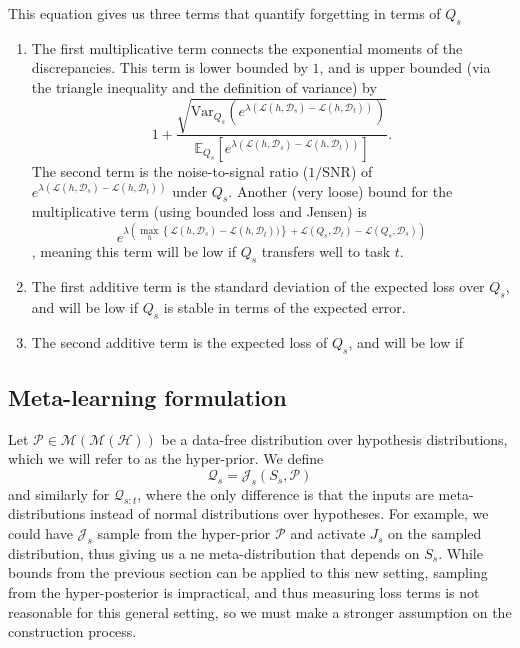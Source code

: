\documentclass[letterpaper]{article}
\theoremstyle{definition}
\begin{document}
This equation gives us three terms that quantify forgetting in terms of $Q_s$
\begin{enumerate}
	\item The first multiplicative term connects the exponential moments of the discrepancies. This term is lower bounded by $1$, and is upper bounded (via the triangle inequality and the definition of variance) by $$1+\frac{\sqrt{\mathrm{Var}_{Q_s}(e^{\lambda(\mathcal{L}(h,\mathcal{D}_s)-\mathcal{L}(h,\mathcal{D}_t))})}}{\mathbb{E}_{Q_s}\left [e^{\lambda(\mathcal{L}(h,\mathcal{D}_s)-\mathcal{L}(h,\mathcal{D}_t))}\right ]}.$$ The second term is the noise-to-signal ratio ($1/\mathrm{SNR}$) of $e^{\lambda(\mathcal{L}(h,\mathcal{D}_s)-\mathcal{L}(h,\mathcal{D}_t))}$ under $Q_s$.
	Another (very loose) bound for the multiplicative term (using bounded loss and Jensen) is $$e^{\lambda (\max_h \left \{\mathcal{L}(h,\mathcal{D}_s)-\mathcal{L}(h,\mathcal{D}_t))\right \}+\mathcal{L}(Q_s,\mathcal{D}_t)-\mathcal{L}(Q_s,\mathcal{D}_s))}$$, meaning this term will be low if $Q_s$ transfers well to task $t$.
	\item The first additive term is the standard deviation of the expected loss over $Q_s$, and will be low if $Q_s$ is stable in terms of the expected error.
	\item The second additive term is the expected loss of $Q_s$, and will be low if
\end{enumerate}


\subsection{Meta-learning formulation}

Let $\mathcal{P}\in\mathcal{M}(\mathcal{M}(\mathcal{H}))$ be a data-free distribution over hypothesis distributions, which we will refer to as the hyper-prior. We define 
$$\mathcal{Q}_s=\mathcal{J}_s(S_s,\mathcal{P})$$ and similarly for $\mathcal{Q}_{s:t}$, where the only difference is that the inputs are meta-distributions instead of normal distributions over hypotheses. For example, we could have $\mathcal{J}_s$ sample from the hyper-prior $\mathcal{P}$ and activate $J_s$ on the sampled distribution, thus giving us a ne meta-distribution that depends on $S_s$. While bounds from the previous section can be applied to this new setting, sampling from the hyper-posterior is impractical, and thus measuring loss terms is not reasonable for this general setting, so we must make a stronger assumption on the construction process.
\end{document}
